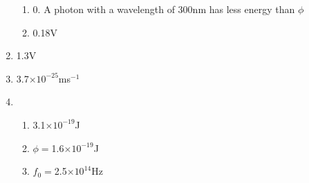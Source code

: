 \documentclass{article}
\begin{document}
\begin{enumerate}
\begin{enumerate}
\item 0. A photon with a wavelength of 300nm has less energy than $\phi$

\item 0.18V

\end{enumerate}

\item 1.3V

\item 3.7$\times10^{-25}$ms$^{-1}$

\item \begin{enumerate}
\item 3.1$\times10^{-19}$J

\item $\phi=$1.6$\times10^{-19}$J

\item $f_0=$2.5$\times10^{14}$Hz

\end{enumerate}

\end{enumerate}
\end{document}
